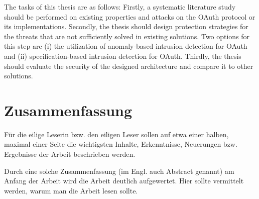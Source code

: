 \documentclass[
    fontsize=12pt,
    headings=small,
    parskip=half,           %
    bibliography=totoc,
    numbers=noenddot,       %
    open=any,               %
    ]{scrreprt}
\begin{document}
The tasks of this thesis are as follows: Firstly, a systematic literature study should be performed on existing properties and attacks on the OAuth protocol or its implementations. Secondly, the thesis should design protection strategies for the threats that are not sufficiently solved in existing solutions. Two options for this step are (i) the utilization of anomaly-based intrusion detection for OAuth and (ii) specification-based intrusion detection for OAuth. Thirdly, the thesis should evaluate the security of the designed architecture and compare it to other solutions.

\chapter*{Zusammenfassung}

Für die eilige Leserin bzw. den eiligen Leser sollen auf etwa einer halben, maximal einer Seite die wichtigsten Inhalte, Erkenntnisse, Neuerungen bzw. Ergebnisse der Arbeit beschrieben werden.

Durch eine solche Zusammenfassung (im Engl. auch Abstract genannt) am Anfang der Arbeit wird die Arbeit deutlich aufgewertet. Hier sollte vermittelt werden, warum man die Arbeit lesen sollte.

\tableofcontents
\end{document}
